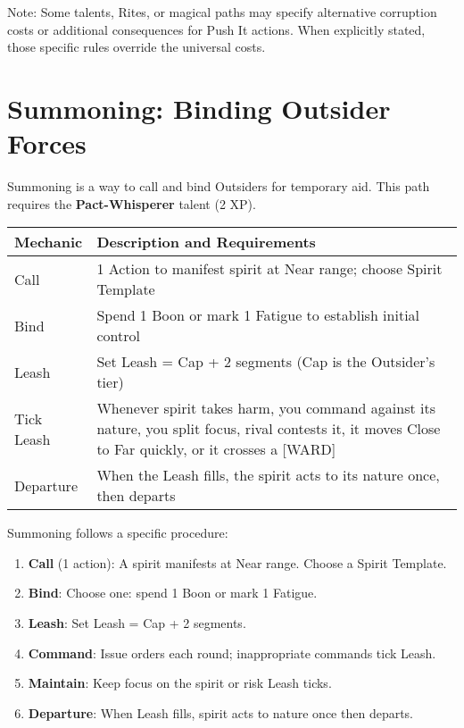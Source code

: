 Note: Some talents, Rites, or magical paths may specify alternative corruption costs or additional consequences for Push It actions. When explicitly stated, those specific rules override the universal costs.


\section*{Summoning: Binding Outsider Forces}

Summoning is a way to call and bind Outsiders for temporary aid. This path requires the \textbf{Pact-Whisperer} talent (2 XP).

\begin{fatebox}
\begin{tabularx}{\textwidth}{lX}
\toprule
\textbf{Mechanic} & \textbf{Description and Requirements} \\
\midrule
Call & 1 Action to manifest spirit at Near range; choose Spirit Template \\
Bind & Spend 1 Boon or mark 1 Fatigue to establish initial control \\
Leash & Set Leash = Cap + 2 segments (Cap is the Outsider's tier) \\
Tick Leash & Whenever spirit takes harm, you command against its nature, you split focus, rival contests it, it moves Close to Far quickly, or it crosses a [WARD] \\
Departure & When the Leash fills, the spirit acts to its nature once, then departs \\
\bottomrule
\end{tabularx}
\end{fatebox}

Summoning follows a specific procedure:
\begin{enumerate}
    \item \textbf{Call} (1 action): A spirit manifests at Near range. Choose a Spirit Template.
    \item \textbf{Bind}: Choose one: spend 1 Boon or mark 1 Fatigue.
    \item \textbf{Leash}: Set Leash = Cap + 2 segments.
    \item \textbf{Command}: Issue orders each round; inappropriate commands tick Leash.
    \item \textbf{Maintain}: Keep focus on the spirit or risk Leash ticks.
    \item \textbf{Departure}: When Leash fills, spirit acts to nature once then departs.
\end{enumerate}


